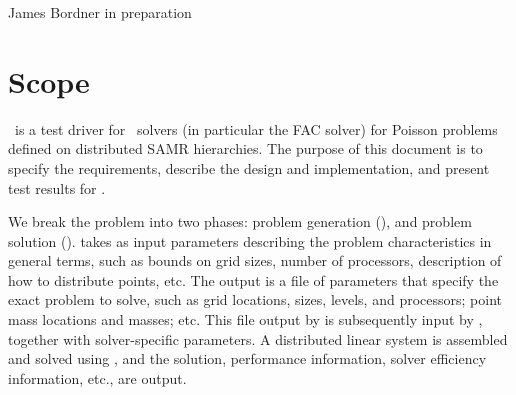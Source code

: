 \documentclass[11pt]{article}
\begin{document}
      {James Bordner}
      {in preparation}

\section{Scope}

   \hypregrav\ is a test driver for \hypre\ solvers (in particular the
   FAC solver) for Poisson problems defined on distributed SAMR
   hierarchies.  The purpose of this document is to specify the
   requirements, describe the design and implementation, and present
   test results for \hypregrav.

   We break the problem into two phases: problem generation
   (), and problem solution ().
    takes as input parameters describing the problem
   characteristics in general terms, such as bounds on grid sizes,
   number of processors, description of how to distribute points, etc.
   The output is a file of parameters that specify the exact problem
   to solve, such as grid locations, sizes, levels, and processors;
   point mass locations and masses; etc.  This file output by
    is subsequently input by ,
   together with solver-specific parameters.  A distributed linear
   system is assembled and solved using \hypre, and the solution,
   performance information, solver efficiency information, etc., are
   output.

\subsection{}
\end{document}
